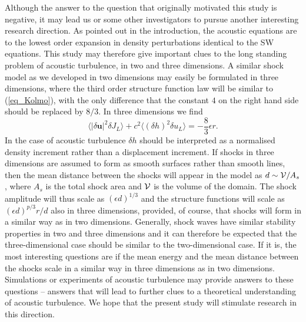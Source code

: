 \documentclass{jfm}
\newcommand{\uu}{\textbf{u}}
\newcommand{\meane}[1]{\langle #1 \rangle}
\begin{document}
Although the answer to the question that originally motivated this study is
negative, it may lead us or some other investigators to pursue another
interesting research direction. As pointed out in the introduction, the
acoustic equations are to the lowest order expansion in density perturbations
identical to the SW equations. This study may therefore give important clues to
the long standing problem of acoustic turbulence, in two and three dimensions.
A similar shock model as we developed in two dimensions may easily be
formulated in three dimensions, where the third order structure function law
will be similar to (\ref{eq_Kolmo}), with the only difference that the constant
$ 4 $ on the right hand side should be replaced by $ 8/3 $. In three dimensions
we find
\begin{equation}
\meane{ |\delta \uu|^2 \delta J_L }
+ c^2\meane{ (\delta h)^2 \delta u_L } = - \frac{8}{3} \epsilon r. \label{eq_Kolmo3}
\end{equation}
In the case of acoustic turbulence $ \delta h $ should be interpreted as a
normalised density increment rather than a displacement increment. If shocks in
three dimensions are assumed to form as smooth surfaces rather than smooth
lines, then the mean distance between the shocks will appear in the
model as $ d \sim {\cal{V}}/A_s $, where $ A_{s} $ is the total shock area and
$ \cal{V} $ is the volume of the domain. The shock amplitude will thus scale as
$ (\epsilon d)^{1/3} $ and the structure functions will scale as $ (\epsilon
d)^{p/3} r/d $ also in three dimensions, provided, of course, that shocks will
form in a similar way as in two dimensions. Generally, shock waves have similar 
stability properties in two and three dimensions \cite[]{ApazidisEliasson2018, LivertsApazidis2016} and 
it can therefore be expected that the three-dimensional case should be similar to the two-dimensional case. 
If it is, the most interesting
questions are if the mean energy and the mean distance between the shocks scale
in a similar way in three dimensions as in two dimensions. Simulations or
experiments of acoustic turbulence may provide answers to these questions --
answers that will lead to further clues to a theoretical understanding of
acoustic turbulence. We hope that the present study will stimulate research in
this direction.




%





\end{document}
